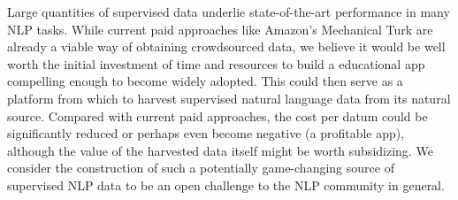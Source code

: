 Large quantities of supervised data underlie state-of-the-art performance in many NLP tasks.
While current paid approaches like Amazon's Mechanical Turk are already a viable way of obtaining crowdsourced data, we believe it would be well worth the initial investment of time and resources to build a educational app compelling enough to become widely adopted.
This could then serve as a platform from which to harvest supervised natural language data from its natural source. 
Compared with current paid approaches, the cost per datum could be significantly reduced or perhaps even become negative (a profitable app), although the value of the harvested data itself might be worth subsidizing.
We consider the construction of such a potentially game-changing source of supervised NLP data to be an open challenge to the NLP community in general.










%
%



